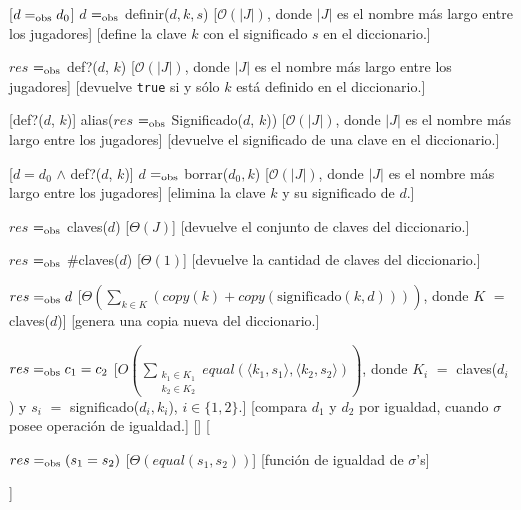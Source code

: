 \documentclass{book}
\newcommand{\bigO}{\mathcal{O}}
\begin{document}
\begin{Algoritmos}
\begin{Interfaz}
  [$d =_{\mathrm{obs}} d_0$]
  {$d$ $=_{\mathrm{obs}}$ definir($d, k, s$)}
  [$\bigO(|J|)$, donde $|J|$ es el nombre más largo entre los jugadores]
  [define la clave $k$ con el significado $s$ en el diccionario.]
  

  {$res$ $=_{\mathrm{obs}}$ def?($d$, $k$)}
  [$\bigO(|J|)$, donde $|J|$ es el nombre más largo entre los jugadores]
  [devuelve \texttt{true} si y sólo $k$ está definido en el diccionario.]

  [def?($d$, $k$)]
  {alias($res$ $=_{\mathrm{obs}}$ Significado($d$, $k$))}
 [$\bigO(|J|)$, donde $|J|$ es el nombre más largo entre los jugadores]
  [devuelve el significado de una clave en el diccionario.]

  [$d = d_0$ $\land$ def?($d$, $k$)]
  {$d$ $=_{\mathrm{obs}}$ borrar($d_0, k$)}
   [$\bigO(|J|)$, donde $|J|$ es el nombre más largo entre los jugadores]
  [elimina la clave $k$ y su significado de $d$.]

  {$res$ $=_{\mathrm{obs}}$ claves($d$)}
  [$\Theta(J)$]
  [devuelve el conjunto de claves del diccionario.]

  {$res$ $=_{\mathrm{obs}}$ \#claves($d$)}
  [$\Theta(1)$]
  [devuelve la cantidad de claves del diccionario.]

  {$res =_{\mathrm{obs}} d$}
  [$\displaystyle\Theta\left(\sum_{k \in K}\left(copy(k) + copy(\text{significado}(k,d))\right)\right)$, donde $K$ $=$ claves($d$)]
  [genera una copia nueva del diccionario.]

  {$res =_{\mathrm{obs}} c_1 = c_2$}
  [$\displaystyle O\left(\sum_{\substack{k_1 \in K_1\\k_2\in K_2}}equal(\langle k_1,s_1\rangle, \langle k_2, s_2 \rangle)\right)$, donde $K_i$ $=$ claves($d_i$) y $s_i$ $=$ significado($d_i, k_i$), $i \in \{1,2\}$.]
  [compara $d_1$ y $d_2$ por igualdad, cuando $\sigma$ posee operación de igualdad.]
  []%
  [{\parbox[t]{\textwidth-3cm}{%
    {$res =_{\mathrm{obs}} (s_1 = s_2)$}
    [$\Theta(equal(s_1, s_2))$]
    [función de igualdad de $\sigma$'s]
  }}]





\end{Interfaz}
\end{Algoritmos}
\end{document}
